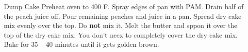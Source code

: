 \documentclass[../cookbook.tex]{subfiles}
\begin{document}
\begin{recipe}{Dump Cake}{}{}
    Preheat oven to 400 \degrees{}F. Spray edges of pan with PAM.
    Drain half of the peach juice off. Pour remaining peaches and juice in a
    pan.
    Spread dry cake mix evenly over the top. Do \textbf{not} mix it.
    Melt the butter and sppon it over the top of the dry cake mix. You don't
    neex to completely cover the dry cake mix. Bake for 35 -- 40 minutes until
    it gets golden brown.
\end{recipe}
\end{document}
